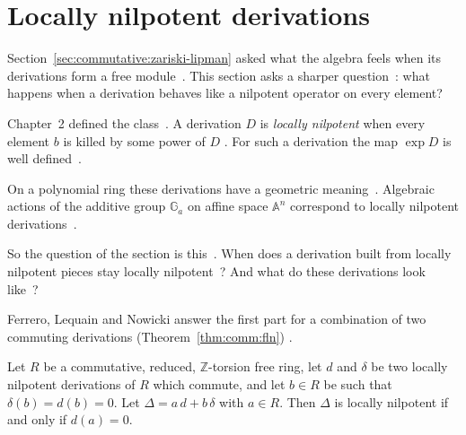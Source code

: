 \section{Locally nilpotent derivations}\label{sec:commutative:locally-nilpotent}

Section~\ref{sec:commutative:zariski-lipman} asked what the algebra feels when
its derivations form a free module~\cite[p.~354]{DaigleFreudenburg1998UFD}. This section asks a sharper
question~\cite[p.~354]{DaigleFreudenburg1998UFD}: what happens when a
derivation behaves like a nilpotent operator on every element?

Chapter~2 defined the class~\cite[Section~1.1.9, p.~12]{Freudenburg2017}. A
derivation $D$ is \emph{locally nilpotent} when every element $b$ is killed by
some power of $D$ \cite[Section~1.1.9, p.~12]{Freudenburg2017}. For such a
derivation the map $\exp D$ is well
defined~\cite[Section~1.1.9, p.~12]{Freudenburg2017}.

On a polynomial ring these derivations have a geometric
meaning~\cite[p.~354]{DaigleFreudenburg1998UFD}. Algebraic actions of the
additive group $\mathbb{G}_a$ on affine space $\mathbb{A}^n$ correspond to
locally nilpotent derivations~\cite[p.~354]{DaigleFreudenburg1998UFD}.

So the question of the section is
this~\cite[Theorem, p.~47]{FerreroLequainNowicki1992}. When does a derivation
built from locally nilpotent pieces stay locally
nilpotent~\cite[Theorem, p.~47]{FerreroLequainNowicki1992}? And what do these
derivations look
like~\cite[Theorem, p.~47]{FerreroLequainNowicki1992}?

Ferrero, Lequain and Nowicki answer the first part for a combination of two
commuting derivations (Theorem~\ref{thm:comm:fln}) \cite[Theorem,
p.~47]{FerreroLequainNowicki1992}.

\begin{theorem}\label{thm:comm:fln}
Let $R$ be a commutative, reduced, $\mathbb{Z}$-torsion free ring, let $d$
and $\delta$ be two locally nilpotent derivations of $R$ which commute, and
let $b\in R$ be such that $\delta(b) = d(b) = 0$. Let
$\Delta = a\,d + b\,\delta$ with $a\in R$. Then $\Delta$ is locally nilpotent
if and only if $d(a) = 0$.
\end{theorem}

